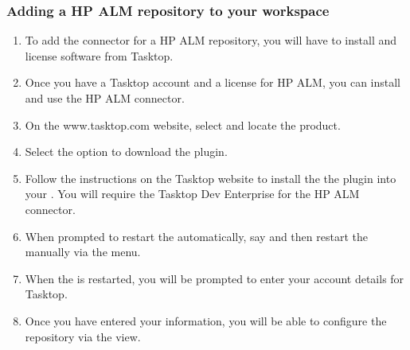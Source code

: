 \subsubsection{Adding a HP ALM repository to your workspace}
\label{TasksHPALMRepo}
\begin{enumerate}
\item To add the connector for a HP ALM repository, you will have to install and license software from Tasktop.
\item Once you have a Tasktop account and a license for HP ALM, you can install and use the HP ALM connector.
\item On the www.tasktop.com website, select  and locate the  product.
\item Select the option to download the plugin.
\item Follow the instructions on the Tasktop website to install the the plugin into your \ite{}. You will require the Tasktop Dev Enterprise for the HP ALM connector. 
\item When prompted to restart the \ite{} automatically, say  and then restart the \ite{} manually via the menu.
\item When the \ite{} is restarted, you will be prompted to enter your account details for Tasktop.
\item Once you have entered your information, you will be able to configure the repository via the  view.
\end{enumerate}
